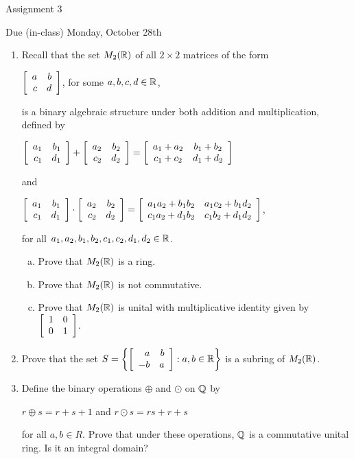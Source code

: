 \documentclass[11pt,fleqn,dvipsnames,usenames]{article}
\renewcommand{\headrulewidth}{1pt}
\begin{document}
\fancyhead[L]{\course}
\fancyhead[R]{\term}
\renewcommand{\headrulewidth}{0.4pt}

\begin{center}
{\huge Assignment 3}
\vsp

{\large Due (in-class) Monday, October 28th}
\end{center}

\begin{enumerate}
\item Recall that the set $M_{2}(\R)$ of all $2\times 2$ matrices of the form
\begin{center}
$\MATRIX{rr}{a & b\\c & d}$, for some $a,b,c,d\in\R$,
\end{center}
is a binary algebraic structure under both addition and multiplication, defined by
\begin{center}
$\MATRIX{rr}{a_1 & b_1\\c_1 & d_1} + \MATRIX{rr}{a_2 & b_2\\c_2 & d_2} = \MATRIX{cc}{a_1 + a_2 & b_1 + b_2\\c_1 + c_2& d_1 + d_2}$
\end{center}
and
\begin{center}
$\MATRIX{rr}{a_1 & b_1\\c_1 & d_1}\cdot \MATRIX{rr}{a_2 & b_2\\c_2 & d_2} = \MATRIX{cc}{a_1a_2 + b_1b_2 & a_1c_2 + b_1d_2\\c_1a_2 + d_1b_2 & c_1b_2 + d_1d_2}$,
\end{center}
for all $a_{1},a_{2},b_{1},b_{2},c_{1},c_{2},d_{1},d_{2}\in\R$.
\vsp
\begin{enumerate}[(a)]
\item Prove that $M_{2}(\R)$ is a ring.
\item Prove that $M_{2}(\R)$ is not commutative.
\item Prove that $M_{2}(\R)$ is unital with multiplicative identity given by $\MATRIX{rr}{1 & 0\\0 & 1}$.
\end{enumerate}

\item Prove that the set $S = \SET{\MATRIX{rr}{a & b\\-b & a}:a,b\in\R}$ is a subring of $M_{2}(\R)$.
\item Define the binary operations $\oplus$ and $\odot$ on $\Q$ by
\begin{center}
$r\oplus s = r + s + 1$ and $r\odot s = rs + r + s$
\end{center}
for all $a,b\in R$.  Prove that under these operations, $\Q$ is a commutative unital ring.  Is it an integral domain?


\end{enumerate}
\end{document}
